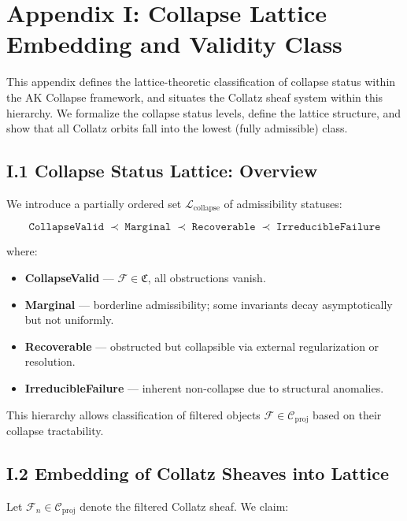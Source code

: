 \documentclass[11pt]{article}
\begin{document}
\appendix
\section*{Appendix I: Collapse Lattice Embedding and Validity Class}

This appendix defines the lattice-theoretic classification of collapse status within the AK Collapse framework, and situates the Collatz sheaf system within this hierarchy. We formalize the collapse status levels, define the lattice structure, and show that all Collatz orbits fall into the lowest (fully admissible) class.

\subsection*{I.1 Collapse Status Lattice: Overview}

We introduce a partially ordered set \( \mathcal{L}_{\mathrm{collapse}} \) of admissibility statuses:

\[
\texttt{CollapseValid} \;\prec\; \texttt{Marginal} \;\prec\; \texttt{Recoverable} \;\prec\; \texttt{IrreducibleFailure}
\]

\noindent where:
\begin{itemize}
  \item \textbf{CollapseValid} — \( \mathcal{F} \in \mathfrak{C} \), all obstructions vanish.
  \item \textbf{Marginal} — borderline admissibility; some invariants decay asymptotically but not uniformly.
  \item \textbf{Recoverable} — obstructed but collapsible via external regularization or resolution.
  \item \textbf{IrreducibleFailure} — inherent non-collapse due to structural anomalies.
\end{itemize}

This hierarchy allows classification of filtered objects \( \mathcal{F} \in \mathcal{C}_{\mathrm{proj}} \) based on their collapse tractability.

\subsection*{I.2 Embedding of Collatz Sheaves into Lattice}

Let \( \mathcal{F}_n \in \mathcal{C}_{\mathrm{proj}} \) denote the filtered Collatz sheaf. We claim:
\end{document}
